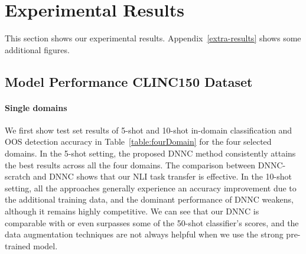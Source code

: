 

\section{Experimental Results}

This section shows our experimental results.
Appendix~\ref{extra-results} shows some additional figures.

\subsection{Model Performance CLINC150 Dataset}
\paragraph{Single domains}
We first show test set results of 5-shot and 10-shot in-domain classification and OOS detection accuracy in Table~\ref{table:fourDomain} for the four selected domains.
In the 5-shot setting, the proposed DNNC method consistently attains the best results across all the four domains.
The comparison between DNNC-scratch and DNNC shows that our NLI task transfer is effective.
In the 10-shot setting, all the approaches generally experience an accuracy improvement due to the additional training data, and the dominant performance of DNNC weakens, although it remains highly competitive.
We can see that our DNNC is comparable with or even surpasses some of the 50-shot classifier's scores, and the data augmentation techniques are not always helpful when we use the strong pre-trained model.





